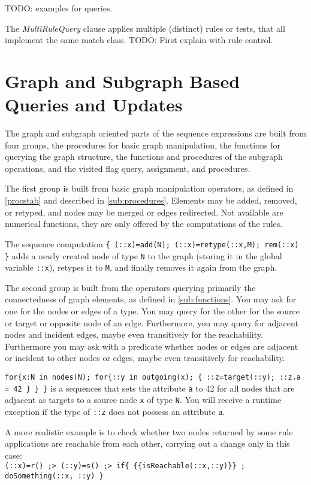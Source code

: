 TODO: examples for queries.

The \emph{MultiRuleQuery} clause applies multiple (distinct) rules or tests, that all implement the same match class.
TODO: First explain with rule control.

\section{Graph and Subgraph Based Queries and Updates}\label{sec:queryupdate}\label{sec:visited}

The graph and subgraph oriented parts of the sequence expressions are built from four groups,
the procedures for basic graph manipulation, the functions for querying the graph structure, the functions and procedures of the subgraph operations, and the visited flag query, assignment, and procedures.

The first group is built from basic graph manipulation operators, as defined in \ref{procstab} and described in \ref{sub:procedures}.
Elements may be added, removed, or retyped, and nodes may be merged or edges redirected.
Not available are numerical functions, they are only offered by the computations of the rules. 

\begin{example}
The sequence computation \verb#{ (::x)=add(N); (::x)=retype(::x,M); rem(::x) }# adds a newly created node of type \texttt{N} to the graph (storing it in the global variable \verb#::x#), retypes it to \texttt{M}, and finally removes it again from the graph.
\end{example}

The second group is built from the operators querying primarily the connectedness of graph elements,
as defined in \ref{sub:functions}.
You may ask for one for the nodes or edges of a type.
You may query for the other for the source or target or opposite node of an edge.
Furthermore, you may query for adjacent nodes and incident edges,
maybe even transitively for the reachability.
Furthermore you may ask with a predicate whether nodes or edges are adjacent or incident to other nodes or edges, maybe even transitively for reachability.

\begin{example}
\verb#for{x:N in nodes(N); for{::y in outgoing(x); { ::z=target(::y); ::z.a = 42 } } }# 
is a sequences that sets the attribute \texttt{a} to 42 for all nodes that are adjacent as targets to a source node \texttt{x} of type \texttt{N}.
You will receive a runtime exception if the type of \verb#::z# does not possess an attribute \texttt{a}.

A more realistic example is to check whether two nodes returned by some rule applications are reachable from each other, carrying out a change only in this case:\\
\verb#(::x)=r() ;> (::y)=s() ;> if{ {{isReachable(::x,::y)}} ; doSomething(::x, ::y) }#
\end{example}

